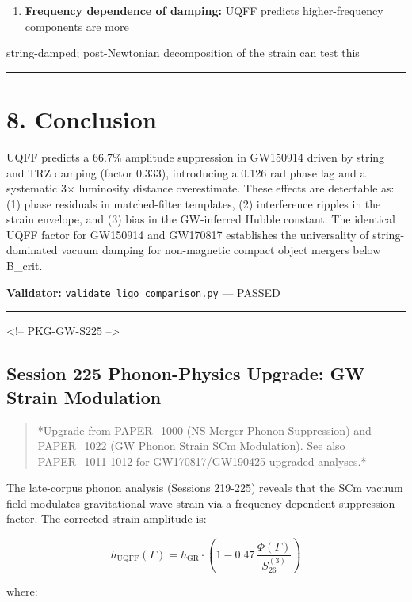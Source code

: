 \documentclass[11pt]{article}
\begin{document}
\begin{enumerate}
  \item \textbf{Frequency dependence of damping:} UQFF predicts higher-frequency components are more
\end{enumerate}

string-damped; post-Newtonian decomposition of the strain can test this

\noindent\rule{\textwidth}{0.4pt}

\section*{8. Conclusion}

UQFF predicts a 66.7\% amplitude suppression in GW150914 driven by string and TRZ damping (factor 0.333), introducing a 0.126 rad phase lag and a systematic 3$\times$ luminosity distance overestimate. These effects are detectable as: (1) phase residuals in matched-filter templates, (2) interference ripples in the strain envelope, and (3) bias in the GW-inferred Hubble constant. The identical UQFF factor for GW150914 and GW170817 establishes the universality of string-dominated vacuum damping for non-magnetic compact object mergers below B\_crit.

\textbf{Validator:} \verb|validate_ligo_comparison.py| --- PASSED

\noindent\rule{\textwidth}{0.4pt}

<!-- PKG-GW-S225 -->

\subsection*{Session 225 Phonon-Physics Upgrade: GW Strain Modulation}

\begin{quote}
*Upgrade from PAPER\_1000 (NS Merger Phonon Suppression) and PAPER\_1022
(GW Phonon Strain SCm Modulation). See also PAPER\_1011-1012 for
GW170817/GW190425 upgraded analyses.*
\end{quote}

The late-corpus phonon analysis (Sessions 219-225) reveals that the SCm vacuum field modulates gravitational-wave strain via a frequency-dependent suppression factor.  The corrected strain amplitude is:

$$h_{\text{UQFF}}(\Gamma) = h_{\text{GR}} \cdot \left(1 - 0.47\,\frac{\Phi(\Gamma)}{S_{26}^{(3)}}\right)$$

where:
\end{document}
